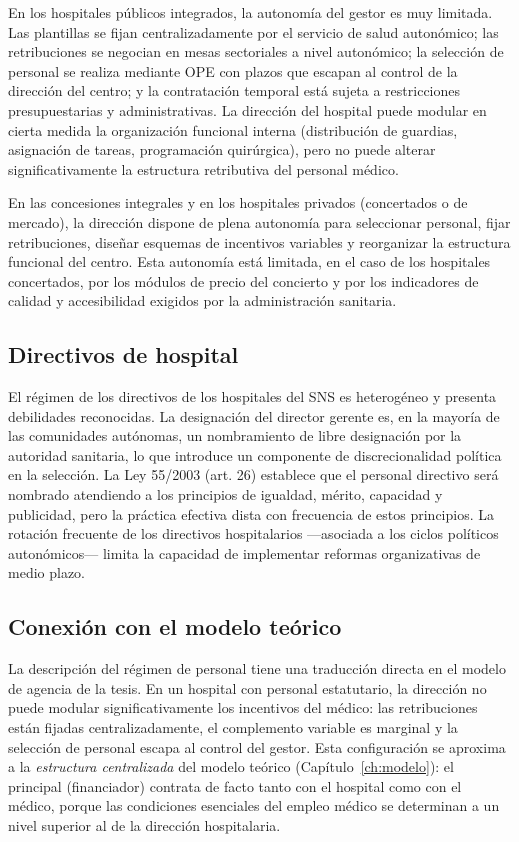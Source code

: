 En los hospitales públicos integrados, la autonomía del gestor es muy limitada. Las plantillas se fijan centralizadamente por el servicio de salud autonómico; las retribuciones se negocian en mesas sectoriales a nivel autonómico; la selección de personal se realiza mediante OPE con plazos que escapan al control de la dirección del centro; y la contratación temporal está sujeta a restricciones presupuestarias y administrativas. La dirección del hospital puede modular en cierta medida la organización funcional interna (distribución de guardias, asignación de tareas, programación quirúrgica), pero no puede alterar significativamente la estructura retributiva del personal médico.

En las concesiones integrales y en los hospitales privados (concertados o de mercado), la dirección dispone de plena autonomía para seleccionar personal, fijar retribuciones, diseñar esquemas de incentivos variables y reorganizar la estructura funcional del centro. Esta autonomía está limitada, en el caso de los hospitales concertados, por los módulos de precio del concierto y por los indicadores de calidad y accesibilidad exigidos por la administración sanitaria.

\subsection{Directivos de hospital}

El régimen de los directivos de los hospitales del SNS es heterogéneo y presenta debilidades reconocidas. La designación del director gerente es, en la mayoría de las comunidades autónomas, un nombramiento de libre designación por la autoridad sanitaria, lo que introduce un componente de discrecionalidad política en la selección. La Ley 55/2003 (art. 26) establece que el personal directivo será nombrado atendiendo a los principios de igualdad, mérito, capacidad y publicidad, pero la práctica efectiva dista con frecuencia de estos principios. La rotación frecuente de los directivos hospitalarios ---asociada a los ciclos políticos autonómicos--- limita la capacidad de implementar reformas organizativas de medio plazo.

\subsection{Conexión con el modelo teórico}

La descripción del régimen de personal tiene una traducción directa en el modelo de agencia de la tesis. En un hospital con personal estatutario, la dirección no puede modular significativamente los incentivos del médico: las retribuciones están fijadas centralizadamente, el complemento variable es marginal y la selección de personal escapa al control del gestor. Esta configuración se aproxima a la \textit{estructura centralizada} del modelo teórico (Capítulo~\ref{ch:modelo}): el principal (financiador) contrata de facto tanto con el hospital como con el médico, porque las condiciones esenciales del empleo médico se determinan a un nivel superior al de la dirección hospitalaria.

